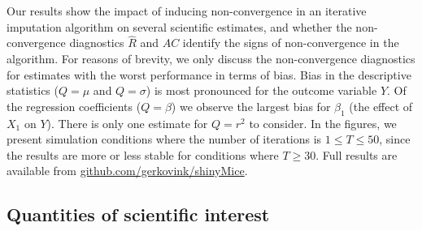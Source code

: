 \documentclass[Royal,times,sageh]{sagej}
\begin{document}
Our results show the impact of inducing non-convergence in an iterative imputation algorithm on several scientific estimates, and whether the non-convergence diagnostics \(\widehat{R}\) and \(AC\) identify the signs of non-convergence in the algorithm. For reasons of brevity, we only discuss the non-convergence diagnostics for estimates with the worst performance in terms of bias. Bias in the descriptive statistics (\(Q=\mu\) and \(Q=\sigma\)) is most pronounced for the outcome variable \(Y\). Of the regression coefficients (\(Q=\beta\)) we observe the largest bias for \(\beta_1\) (the effect of \(X_1\) on \(Y\)). There is only one estimate for \(Q=r^2\) to consider. In the figures, we present simulation conditions where the number of iterations is \(1 \leq T\leq50\), since the results are more or less stable for conditions where \(T \geq 30\). Full results are available from \href{https://github.com/gerkovink/shinyMice/tree/master/3.Thesis/1.SimulationStudy}{github.com/gerkovink/shinyMice}.

\hypertarget{quantities-of-scientific-interest}{%
\subsection{Quantities of scientific interest}\label{quantities-of-scientific-interest}}
\end{document}
